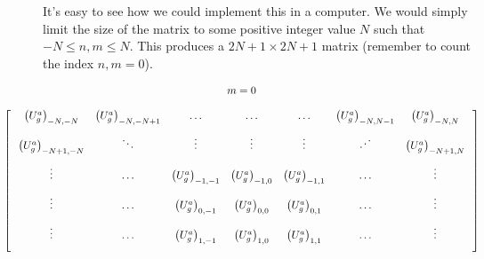 \documentclass{article}
\begin{document}
It's easy to see how we could implement this in a computer. We would simply limit the size of the matrix to some positive integer value $N$ such that $-N \leq n,m \leq N$. This produces a $2N+1 \times 2N+1$ matrix (remember to count the index $n,m=0$).


\small
\[%
    \hspace{-1.3cm}
    \begin{matrix}
        m=0 &  \vspace{0.4cm}\\
        \begin{bmatrix} 
            \hspace{0.25cm} \left(U^{a}_{g}\right)_{-N,-N}   & \left(U^{a}_{g}\right)_{-N,-N+1} & \ldots                         & \ldots                        & \ldots & \left(U^{a}_{g}\right)_{-N,N-1} & \left(U^{a}_{g}\right)_{-N,N}     \hspace{0.25cm} \vspace{0.25cm} \\
            \hspace{0.25cm} \left(U^{a}_{g}\right)_{-N+1,-N} & \ddots                           & \vdots                         & \vdots                        & \vdots                          & \iddots                         & \left(U^{a}_{g}\right)_{-N+1,N}     \hspace{0.25cm} \vspace{0.25cm} \\
            \hspace{0.25cm} \vdots                           & \ldots                           & \left(U^{a}_{g}\right)_{-1,-1} & \left(U^{a}_{g}\right)_{-1,0} & \left(U^{a}_{g}\right)_{-1,1}   & \ldots                          & \vdots    \hspace{0.25cm} \vspace{0.25cm} \\
            \hspace{0.25cm} \vdots                           & \ldots                           & \left(U^{a}_{g}\right)_{0,-1}  & \left(U^{a}_{g}\right)_{0,0}  & \left(U^{a}_{g}\right)_{0,1}    & \ldots                          & \vdots                            \hspace{0.25cm} \vspace{0.25cm} \\
            \hspace{0.25cm} \vdots                           & \ldots                           & \left(U^{a}_{g}\right)_{1,-1}  & \left(U^{a}_{g}\right)_{1,0}  & \left(U^{a}_{g}\right)_{1,1}    & \ldots                          & \vdots     \hspace{0.25cm} \vspace{0.25cm} \\

\end{bmatrix}
\end{matrix}\]
\end{document}
